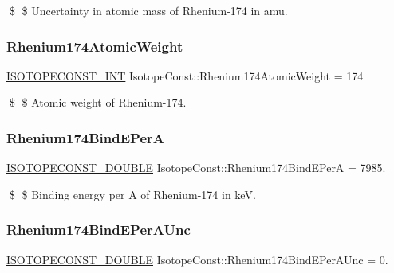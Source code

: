 \$ \$ Uncertainty in atomic mass of Rhenium-\/174 in amu. \mbox{\label{group___isotope_const-_rhenium-_re174_ga5192b7b9b72fbffedca0df44ea44ac3a}} 
\subsubsection{\texorpdfstring{Rhenium174\+Atomic\+Weight}{Rhenium174AtomicWeight}}
{\footnotesize\ttfamily \mbox{\hyperlink{group___isotope_const-_macros_ga5f18360b3e99483a35c32d789e62621c}{I\+S\+O\+T\+O\+P\+E\+C\+O\+N\+S\+T\+\_\+\+I\+NT}} Isotope\+Const\+::\+Rhenium174\+Atomic\+Weight = 174}

\$ \$ Atomic weight of Rhenium-\/174. \mbox{\label{group___isotope_const-_rhenium-_re174_gad54839194b75bb6186a39eb06fc663fd}} 
\subsubsection{\texorpdfstring{Rhenium174\+Bind\+E\+PerA}{Rhenium174BindEPerA}}
{\footnotesize\ttfamily \mbox{\hyperlink{group___isotope_const-_macros_ga8f45a7272ce02c0b4c65c44636ed719a}{I\+S\+O\+T\+O\+P\+E\+C\+O\+N\+S\+T\+\_\+\+D\+O\+U\+B\+LE}} Isotope\+Const\+::\+Rhenium174\+Bind\+E\+PerA = 7985.}

\$ \$ Binding energy per A of Rhenium-\/174 in keV. \mbox{\label{group___isotope_const-_rhenium-_re174_ga72098bf028ab166ec1fe27b7a49258bc}} 
\subsubsection{\texorpdfstring{Rhenium174\+Bind\+E\+Per\+A\+Unc}{Rhenium174BindEPerAUnc}}
{\footnotesize\ttfamily \mbox{\hyperlink{group___isotope_const-_macros_ga8f45a7272ce02c0b4c65c44636ed719a}{I\+S\+O\+T\+O\+P\+E\+C\+O\+N\+S\+T\+\_\+\+D\+O\+U\+B\+LE}} Isotope\+Const\+::\+Rhenium174\+Bind\+E\+Per\+A\+Unc = 0.}

